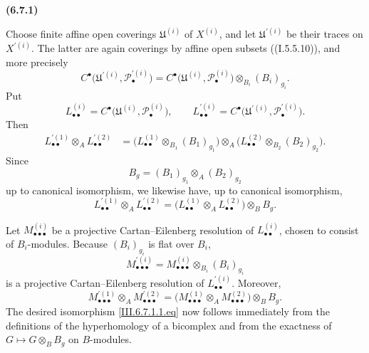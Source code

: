 \documentclass[10pt,oneside]{book}
\newcommand{\sh}[1]{\mathscr{#1}}
\newcommand{\sref}[2][]{(#2)}
\newcommand{\oldpage}[2][]{\setcounter{footnote}{0}\marginpar{\scriptsize\textbf{#1}~|~#2}\ignorespaces}
\newenvironment{env}[1][]{\par\medskip\noindent\textbf{(#1)}\ }{\par}
\begin{document}
\begin{env}[6.7.1]
\oldpage[III]{158}

Choose finite affine open coverings $\mathfrak U^{(i)}$ of
$X^{(i)}$, and let $\mathfrak U^{\prime(i)}$ be their traces on
$X^{\prime(i)}$.  The latter are again coverings by affine open
subsets (\sref[I]{I.5.5.10}), and more precisely
\[
  C^\bullet
  \bigl(
    \mathfrak U^{\prime(i)},\sh P_\bullet^{\prime(i)}
  \bigr)
  =
  C^\bullet
  \bigl(
    \mathfrak U^{(i)},\sh P_\bullet^{(i)}
  \bigr)
  \otimes_{B_i}(B_i)_{g_i}.
\]
Put
\[
  L_{\bullet\bullet}^{(i)}
  =
  C^\bullet
  \bigl(
    \mathfrak U^{(i)},\sh P_\bullet^{(i)}
  \bigr),
  \qquad
  L_{\bullet\bullet}^{\prime(i)}
  =
  C^\bullet
  \bigl(
    \mathfrak U^{\prime(i)},\sh P_\bullet^{\prime(i)}
  \bigr).
\]
Then
\[
\begin{split}
  L_{\bullet\bullet}^{\prime(1)}
  \otimes_A L_{\bullet\bullet}^{\prime(2)}
  &=
  \bigl(
    L_{\bullet\bullet}^{(1)}
    \otimes_{B_1}(B_1)_{g_1}
  \bigr)
  \otimes_A
  \bigl(
    L_{\bullet\bullet}^{(2)}
    \otimes_{B_2}(B_2)_{g_2}
  \bigr).
\end{split}
\]
Since
\[
  B_g=(B_1)_{g_1}\otimes_A(B_2)_{g_2}
\]
up to canonical isomorphism, we likewise have, up to canonical
isomorphism,
\[
  L_{\bullet\bullet}^{\prime(1)}
  \otimes_A L_{\bullet\bullet}^{\prime(2)}
  =
  \bigl(
    L_{\bullet\bullet}^{(1)}
    \otimes_A L_{\bullet\bullet}^{(2)}
  \bigr)
  \otimes_BB_g.
\]

Let $M_{\bullet\bullet\bullet}^{(i)}$ be a projective
Cartan--Eilenberg resolution of $L_{\bullet\bullet}^{(i)}$,
chosen to consist of $B_i$-modules.  Because $(B_i)_{g_i}$ is
flat over $B_i$,
\[
  M_{\bullet\bullet\bullet}^{\prime(i)}
  =
  M_{\bullet\bullet\bullet}^{(i)}
  \otimes_{B_i}(B_i)_{g_i}
\]
is a projective Cartan--Eilenberg resolution of
$L_{\bullet\bullet}^{\prime(i)}$.  Moreover,
\[
  M_{\bullet\bullet\bullet}^{\prime(1)}
  \otimes_A M_{\bullet\bullet\bullet}^{\prime(2)}
  =
  \bigl(
    M_{\bullet\bullet\bullet}^{(1)}
    \otimes_A M_{\bullet\bullet\bullet}^{(2)}
  \bigr)
  \otimes_BB_g.
\]
The desired isomorphism \eqref{III.6.7.1.1.eq} now follows
immediately from the definitions of the hyperhomology of a
bicomplex and from the exactness of
$G\longmapsto G\otimes_BB_g$ on $B$-modules.
\end{env}
\end{document}
